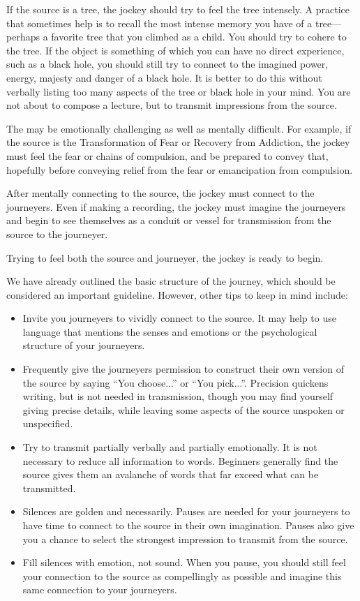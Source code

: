 \documentclass[12pt]{book}
\begin{document}
If the
source is a tree, the jockey should try to feel the
tree intensely. A practice that sometimes help is to recall
the most intense memory you have of a tree---perhaps a
favorite tree that you climbed as a child. You
should try to cohere to the tree. If the object
is something of which you can have no direct
experience, such as a black hole, you should still
try to connect to the imagined power, energy, majesty
and danger of a black hole. It is better to
do this without verbally listing too many
aspects of the tree or black hole in your mind.
You are not about to compose a lecture, but to
transmit impressions from the source.

The may be emotionally challenging as well as
mentally difficult.  For example, if the
source is the Transformation of Fear or
Recovery from Addiction, the jockey must feel
the fear or chains of compulsion, and be prepared to
convey that, hopefully before conveying relief
from the fear or emancipation from compulsion.

After mentally connecting to the source,
the jockey must connect to the journeyers.
Even if making a recording, the jockey must
imagine the journeyers and begin to see
themselves as a conduit or vessel for transmission
from the source to the journeyer.

Trying to feel both the source and journeyer,
the jockey is ready to begin.

We have already outlined the basic structure
of the journey, which should be considered
an important guideline.
However, other tips to keep in mind include:
\begin{itemize}
\item Invite you journeyers to vividly
  connect to the source. It may help to use language
  that mentions the senses and emotions or the
  psychological structure of your journeyers.
\item Frequently give the journeyers permission
  to construct their own version of the source
  by saying ``You choose...'' or ``You pick...''.
  Precision quickens writing, but is not needed in
  transmission, though you may find yourself giving
  precise details, while leaving some aspects of the
  source unspoken or unspecified.
\item Try to transmit partially verbally
  and partially emotionally. It is not necessary
  to reduce all information to words.  Beginners
  generally find the source gives them an avalanche
  of words that far exceed what can be transmitted.
\item Silences are golden and necessarily. Pauses
  are needed for your journeyers to have time to
  connect to the source in their own imagination.
  Pauses also give you a chance to select the strongest
  impression to transmit from the source.
\item Fill silences with emotion, not sound. When
  you pause, you should still feel your connection to the
  source as compellingly as possible and imagine this
  same connection to your journeyers.
\end{itemize}
\end{document}
